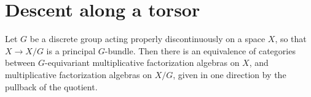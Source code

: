\section{Descent along a torsor}

Let $G$ be a discrete group acting properly discontinuously on a space $X$, so that $X \to X/G$ is a principal $G$-bundle. Then there is an equivalence of categories between $G$-equivariant multiplicative factorization algebras on $X$, and multiplicative factorization algebras on $X/G$, given in one direction by the pullback of the quotient.
